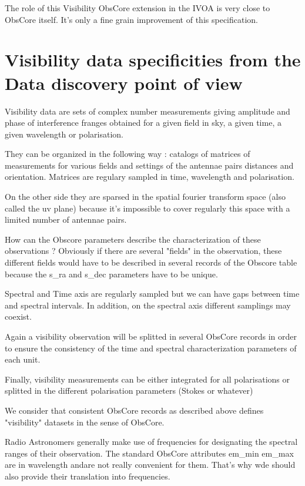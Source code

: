 \documentclass[11pt,a4paper]{ivoa}
\begin{document}
The role of this Visibility ObsCore extension in the IVOA is very close to ObsCore itself. It's only a fine grain improvement of this specification. 



\section{Visibility data specificities from the Data discovery point of view}
\label{sec:specificities}

    Visibility data are sets of  complex number measurements giving amplitude and phase of interference franges obtained for a given field in sky, a given time, a given wavelength or polarisation. 

    They can be organized in the following way : catalogs of matrices of measurements for various fields and settings of the antennae pairs distances and orientation. Matrices are regulary sampled in time, wavelength and polarisation.
    
    On the other side they are sparsed in the spatial fourier transform space (also called the uv plane) because it's impossible to cover regularly this space with a limited number of antennae pairs.
    

    How can the Obscore parameters describe the characterization of these observations ?
    Obviously if there are several "fields" in the observation, these different fields would have to be described in several records of the Obscore table because the s\_ra and s\_dec parameters have to be unique.

   Spectral and Time axis are regularly sampled but we can have gaps between time and spectral intervals. In addition, on the spectral axis different samplings may coexist.  
   
   
    Again a visibility observation will be splitted in several ObsCore records in order to ensure the consistency of the time and spectral characterization parameters of each unit.
    

    Finally, visibility measurements can be either integrated for all polarisations or splitted in the different polarisation parameters (Stokes or whatever) 

    
    We consider that  consistent ObsCore records as described above defines  "visibility" datasets in the sense of ObsCore.

    Radio Astronomers generally make use of frequencies for designating the spectral ranges of their observation. The standard ObsCore attributes em\_min em\_max  are in wavelength  andare not really convenient for them. That's why wde should also provide  their translation into frequencies. 
        
\end{document}
